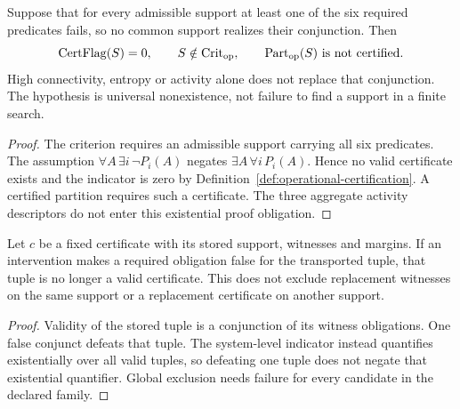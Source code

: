 \begin{proposition}\label{prop:complexity-only-negative-control}
Suppose that for every admissible support at least one of the six required
predicates fails, so no common support realizes their conjunction. Then
\[
 \operatorname{CertFlag}(S)=0,\qquad
 S\notin\mathrm{Crit}_{\mathrm{op}},\qquad \mathrm{Part}_{\mathrm{op}}(S)\text{ is not certified}.
\]
High connectivity, entropy or activity alone does not replace that conjunction.
The hypothesis is universal nonexistence, not failure to find a support in a
finite search.
\end{proposition}
\begin{proof}
The criterion requires an admissible support carrying all six predicates.
The assumption $\forall A\,\exists i\,\neg P_i(A)$ negates
$\exists A\,\forall i\,P_i(A)$. Hence no valid certificate exists and the
indicator is zero by Definition~\ref{def:operational-certification}.
A certified partition requires such a certificate. The three aggregate
activity descriptors do not enter this existential proof obligation.
\end{proof}

\begin{proposition}\label{prop:ablation-prediction}
Let $c$ be a fixed certificate with its stored support, witnesses and margins.
If an intervention makes a required obligation false for the transported tuple,
that tuple is no longer a valid certificate. This does not exclude replacement
witnesses on the same support or a replacement certificate on another support.
\end{proposition}
\begin{proof}
Validity of the stored tuple is a conjunction of its witness obligations.
One false conjunct defeats that tuple. The system-level indicator instead
quantifies existentially over all valid tuples, so defeating one tuple does
not negate that existential quantifier. Global exclusion needs failure for
every candidate in the declared family.
\end{proof}

